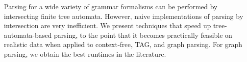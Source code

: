 Parsing for a wide variety of grammar formalisms can be performed by intersecting finite tree automata. However, naive implementations of parsing by intersection are very inefficient. We present techniques that speed up tree-automata-based parsing, to the point that it becomes practically feasible on realistic data when applied to context-free, TAG, and graph parsing. For graph parsing, we obtain the best runtimes in the literature.
